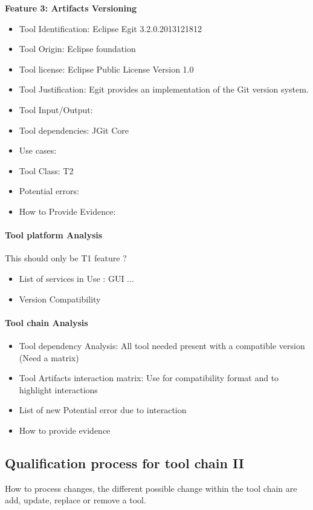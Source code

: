{\bf Feature 3: Artifacts Versioning}\\
  \begin{itemize}
  \item Tool Identification: Eclipse  Egit   3.2.0.2013121812
  \item Tool Origin: Eclipse foundation
  \item Tool license:  Eclipse Public License Version 1.0
  \item Tool Justification: Egit provides an implementation of the Git
    version system. 
  \item Tool Input/Output: 
  \item Tool dependencies: JGit Core
  \item Use cases:
  \item Tool Class: T2
  \item Potential errors:
  \item How to Provide Evidence:                 
  \end{itemize}


\paragraph{Tool platform Analysis}
This should only be T1 feature ?
\begin{itemize}
\item List of services in Use : GUI ...
\item Version Compatibility
\end{itemize}
\paragraph{Tool chain Analysis}
\begin{itemize}
\item Tool dependency Analysis: All tool needed present with a
  compatible version (Need a matrix)
\item Tool Artifacts interaction matrix: Use for compatibility format
  and to highlight interactions
\item List of new Potential error due to interaction
\item How to provide evidence 
\end{itemize}

\subsection{Qualification process for tool chain II}
How to process changes, the different possible change within the tool
chain are add, update, replace or remove a tool.

